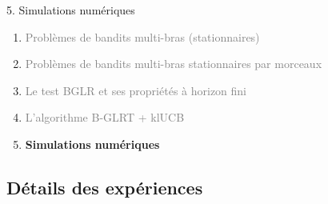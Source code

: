 \documentclass[11pt,french,ignorenonframetext,]{beamer}
\begin{document}
\begin{frame}{5. Simulations numériques}

  \begin{enumerate}
    \item
    \textcolor{gray}{
      Problèmes de bandits multi-bras (stationnaires)
    }
    \vspace*{15pt}

    \item
    \textcolor{gray}{
      Problèmes de bandits multi-bras stationnaires par morceaux
    }
    \vspace*{15pt}

    \item
    \textcolor{gray}{
      Le test BGLR et ses propriétés à horizon fini
    }
    \vspace*{15pt}

    \item
    \textcolor{gray}{
      L'algorithme B-GLRT + klUCB
    }
    \vspace*{15pt}


    \item
    \alert{\textbf{%
      Simulations numériques
    }}
  \end{enumerate}

\end{frame}


\subsection{\hfill{}Détails des expériences\hfill{}}
\end{document}
